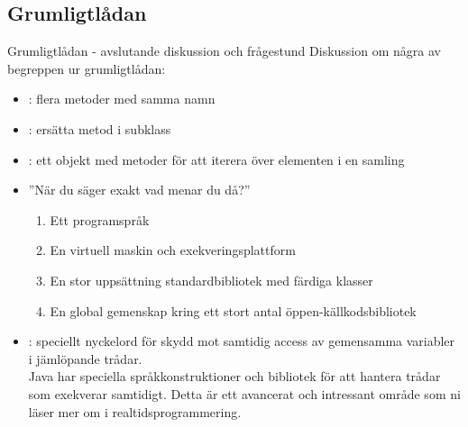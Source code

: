 \documentclass{lecturenotes}
\begin{document}
\subsection{Grumligtlådan}
\begin{Slide}{Grumligtlådan - avslutande diskussion och frågestund}
Diskussion om några av begreppen ur grumligtlådan: 
\begin{itemize}
\item {}: flera metoder med samma namn
\item {}: ersätta metod i subklass
\item {}: ett objekt med metoder för att iterera över elementen i en samling
\item ''När du säger  exakt vad menar du då?''
\begin{enumerate}\footnotesize
\item Ett programspråk
\item En virtuell maskin och exekveringsplattform
\item En stor uppsättning standardbibliotek med färdiga klasser
\item En global gemenskap kring ett stort antal öppen-källkodsbibliotek
\end{enumerate}
\item {}: speciellt nyckelord för skydd mot samtidig access av gemensamma variabler i jämlöpande trådar. \\ \footnotesize Java har speciella språkkonstruktioner och bibliotek för att hantera trådar som exekverar samtidigt. Detta är ett avancerat och intressant område som ni läser mer om i realtidsprogrammering.
\end{itemize}
\end{Slide}

\end{document}
